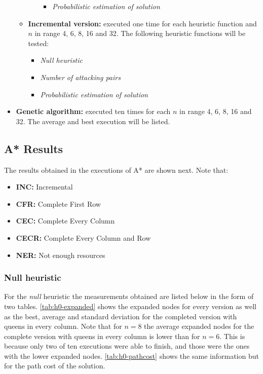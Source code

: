 \documentclass[]{llncs}
\begin{document}
\begin{itemize}
\begin{itemize}
\begin{itemize}
\begin{itemize}
                            \item \textit{Probabilistic estimation of solution}
                        \end{itemize}
                \end{itemize}
            \item \textbf{Incremental version:} executed one time for each heuristic function and $n$ in range 4, 6, 8, 16 and 32. The following heuristic functions will be tested:
                \begin{itemize}
                    \item \textit{Null heuristic}
                    \item \textit{Number of attacking pairs}
                    \item \textit{Probabilistic estimation of solution}
                \end{itemize}
        \end{itemize}
    \item \textbf{Genetic algorithm:} executed ten times for each $n$ in range 4, 6, 8, 16 and 32. The average and best execution will be listed.
\end{itemize}
\subsection{A* Results}\label{astar_results}
The results obtained in the executions of A* are shown next. Note that:

\begin{itemize}
    \item \textbf{INC:} Incremental
    \item \textbf{CFR:} Complete First Row
    \item \textbf{CEC:} Complete Every Column
    \item \textbf{CECR:} Complete Every Column and Row
    \item \textbf{NER:} Not enough resources
\end{itemize}
\subsubsection{Null heuristic}
For the \textit{null} heuristic the measurements obtained are listed below in the form of two tables. \ref{tab:h0-expanded} shows the expanded nodes for every version as well as the best, average and standard deviation for the completed version with queens in every column. Note that for $n = 8$ the average expanded nodes for the complete version with queens in every column is lower than for $n = 6$. This is because only two of ten executions were able to finish, and those were the ones with the lower expanded nodes. \ref{tab:h0-pathcost} shows the same information but for the path cost of the solution.
\end{document}
